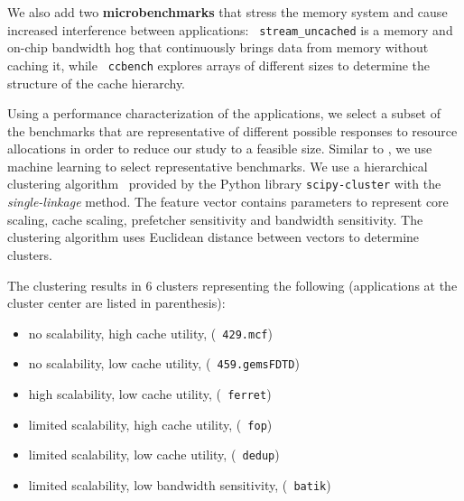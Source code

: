 We also add two \textbf{microbenchmarks} that stress the memory
system and cause increased interference between applications: \texttt{ stream\_uncached} is a memory and on-chip bandwidth hog
that continuously brings data from memory without caching it, while
\texttt{ ccbench} explores arrays of different sizes to determine the
structure of the cache hierarchy.

Using a performance characterization of the applications, we select a subset of the benchmarks that are representative of different possible responses to resource allocations in order to reduce our study to a feasible size.  Similar to \cite{Phansalkar:ISCA2007}, we use machine learning to select representative benchmarks.  We use a
hierarchical clustering algorithm~\cite{Phansalkar:ISCA2007} provided by the Python library \texttt{scipy-cluster} with the \textit{single-linkage} method.  The feature vector contains parameters to represent core scaling, cache scaling, prefetcher sensitivity and bandwidth sensitivity.  The clustering algorithm uses Euclidean distance between vectors to determine clusters.

The clustering results in 6 clusters representing the following (applications at the cluster center are listed in parenthesis):
 \begin{itemize}\itemsep0pt \parskip0pt 
\item no scalability, high cache utility, (\texttt{ 429.mcf})
\item no scalability, low cache utility, (\texttt{ 459.gems\-FDTD})
\item high scalability, low cache utility, (\texttt{ ferret})
\item limited scalability, high cache utility, (\texttt{ fop})
\item limited scalability, low cache utility, (\texttt{ dedup})
\item limited scalability, low bandwidth sensitivity, (\texttt{ batik})
\end{itemize}



